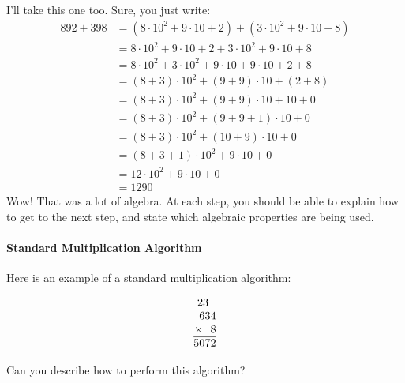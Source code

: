 I'll take this one too. Sure, you just write:
\begin{align*}
892 + 398 &= (8\cdot 10^2 + 9\cdot 10 + 2) + (3 \cdot 10^2 + 9\cdot 10 + 8) \\
&= 8\cdot 10^2 + 9\cdot 10 + 2 + 3 \cdot 10^2 + 9\cdot 10 + 8 \\
&= 8\cdot 10^2 + 3 \cdot 10^2 + 9\cdot 10 + 9\cdot 10 + 2 + 8 \\
&= (8 + 3)\cdot 10^2 + (9 + 9)\cdot 10 + (2 + 8) \\
&= (8 + 3)\cdot 10^2 + (9 + 9)\cdot 10 + 10 + 0\\
&= (8 + 3)\cdot 10^2 + (9 + 9+1)\cdot 10 + 0 \\
&= (8 + 3)\cdot 10^2 + (10 + 9)\cdot 10 + 0 \\
&= (8 + 3+1)\cdot 10^2 + 9\cdot 10 + 0 \\
&= 12\cdot 10^2 + 9\cdot 10 + 0 \\
&= 1290
\end{align*}
Wow! That was a lot of algebra. At each step, you should be able to
explain how to get to the next step, and state which algebraic
properties are being used.


\paragraph{Standard Multiplication Algorithm}
Here is an example of a standard multiplication algorithm:

\[
\begin{array}{@{}r@{}}
23~~\\
634\\
\times~~8\\ \hline
5072
\end{array}
\]

\begin{question}
Can you describe how to perform this algorithm?
\end{question}

